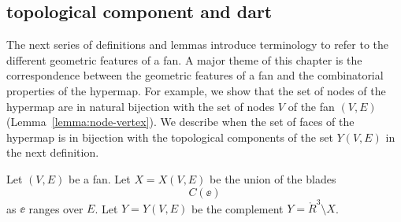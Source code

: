 \subsection{topological component and dart}

The next series of definitions and lemmas introduce terminology to
refer to the different geometric features of a fan.  A major theme of
this chapter is the correspondence between the geometric features of a
fan and the combinatorial properties of the hypermap.  For example, we
show that the set of nodes of the hypermap are in natural bijection
with the set of nodes $V$ of the fan $(V,E)$
(Lemma~\ref{lemma:node-vertex}).  We describe when the set of faces of
the hypermap is in bijection with the topological components of the
set $Y(V,E)$ in the next definition.

\begin{definition}[X,~Y]\label{def:XY}
Let $(V,E)$ be a fan.  Let $X=X(V,E)$ be the union of the
blades
\begin{displaymath}C(\ee)\end{displaymath}
as $\ee$ ranges over $E$.  Let $Y=Y(V,E)$ be the complement
$Y = \ring{R}^3\setminus X$.
%
%
\end{definition}

